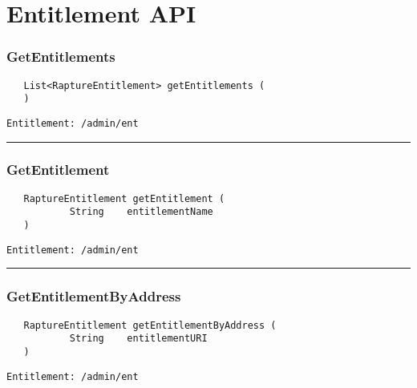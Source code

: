 \chapter{Entitlement API}

\subsection{GetEntitlements}
\label{Api:GetEntitlements}
\begin{verbatim}
   List<RaptureEntitlement> getEntitlements (
   )
\end{verbatim}
\begin{Verbatim}[fontsize=\small, formatcom=\color{Maroon}]
  Entitlement: /admin/ent
\end{Verbatim}



\rule{12cm}{2pt}
\subsection{GetEntitlement}
\label{Api:GetEntitlement}
\begin{verbatim}
   RaptureEntitlement getEntitlement (
           String    entitlementName
   )
\end{verbatim}
\begin{Verbatim}[fontsize=\small, formatcom=\color{Maroon}]
  Entitlement: /admin/ent
\end{Verbatim}



\rule{12cm}{2pt}
\subsection{GetEntitlementByAddress}
\label{Api:GetEntitlementByAddress}
\begin{verbatim}
   RaptureEntitlement getEntitlementByAddress (
           String    entitlementURI
   )
\end{verbatim}
\begin{Verbatim}[fontsize=\small, formatcom=\color{Maroon}]
  Entitlement: /admin/ent
\end{Verbatim}




